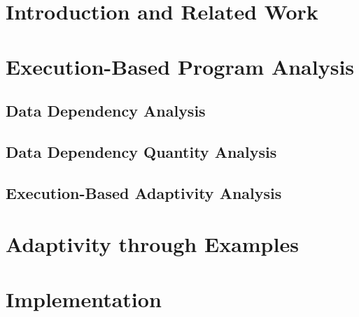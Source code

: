 \section{Introduction and Related Work}
\label{sec:dynamic-intro}
% 


\section{Execution-Based Program Analysis}
\label{sec:dynamic-analysis}

\subsection{Data Dependency Analysis}
\label{subsec:dynamic-datadep}


\subsection{Data Dependency Quantity Analysis}
\label{subsec:dynamic-reachability}
%

\subsection{Execution-Based Adaptivity Analysis}
\label{subsec:dynamic-adapt}
%
%
\section{Adaptivity through Examples}
\label{sec:dynamic-examples}


\section{Implementation}
\label{sec:dynamic-implementation}
%
